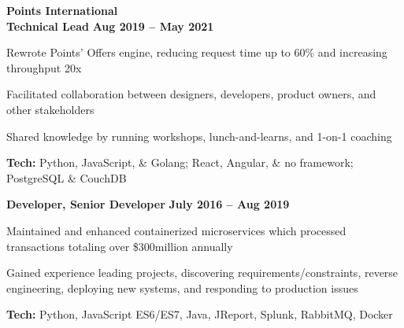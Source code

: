 \documentclass[margin,line]{resume}
\begin{document}
\begin{resume}
    \hspace{-3mm}\textbf{\listing Points International} \vspace{2mm}\\\vspace{1mm}
    \hspace{1.2mm}\textbf{Technical Lead} \hfill \textbf{Aug 2019 -- May 2021}\vspace{1mm}
    \begin{list2}
        \item Rewrote Points’ Offers engine, reducing request time up to 60\% and increasing throughput 20x
        \vspace{1mm}
        \item Facilitated collaboration between designers, developers, product owners, and other stakeholders
        \vspace{1mm}
        \item Shared knowledge by running workshops, lunch-and-learns, and 1-on-1 coaching
        \vspace{1mm}
        \item\textbf{Tech:} Python, JavaScript, \& Golang; React, Angular, \& no framework; PostgreSQL \& CouchDB
    \end{list2}

    \hspace{2.6mm}\textbf{Developer, Senior Developer} \hfill \textbf{July 2016 -- Aug 2019}\vspace{1mm}
    \begin{list2}
        \item Maintained and enhanced containerized microservices which processed transactions totaling over \$300million annually
        \vspace{1mm}
        \item Gained experience leading projects, discovering requirements/constraints, reverse engineering, deploying new systems, and responding to production issues
        \vspace{1mm}
        \item\textbf{Tech:} Python, JavaScript ES6/ES7, Java, JReport, Splunk, RabbitMQ, Docker
    \end{list2}


\end{resume}
\end{document}
